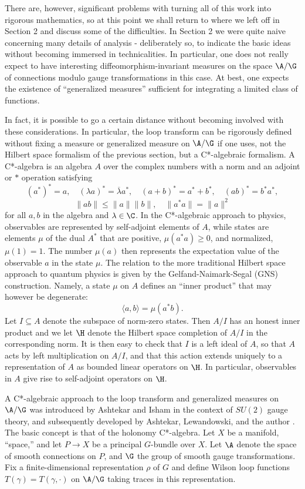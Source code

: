 There are, however, significant problems with turning all of this work into
rigorous mathematics, so at this point we shall return to where we left off
in Section 2 and discuss some of the difficulties. In Section 2 we were
quite naive concerning many details of analysis - deliberately so, to
indicate the basic ideas without becoming immersed in technicalities.   In
particular, one does not really expect to have interesting
diffeomorphism-invariant measures on the space $\A/\G$ of connections
modulo gauge transformations in this case.  At best, one expects the
existence of  ``generalized measures'' sufficient for integrating a limited
class of functions.

In fact, it is possible to go a certain distance without becoming involved
with these considerations.   In particular,
the loop transform can be rigorously defined without fixing a
measure or generalized measure on $\A/\G$ if one uses, not the Hilbert
space formalism of the previous section, but a C*-algebraic formalism.  A
C*-algebra is an algebra $A$ over the complex numbers with a norm and an
adjoint or $\ast$ operation satisfying
\[    (a^\ast)^\ast = a,\quad
(\lambda a)^\ast = \overline \lambda a^\ast, \quad (a + b)^\ast = a^\ast +
b^\ast, \quad (ab)^\ast = b^\ast a^\ast ,\]
\[    \|ab\| \le \|a\| \|b\| , \quad \|a^\ast a\| = \|a\|^2 \]
for all $a,b$ in the algebra and $\lambda
\in \C$.  In the C*-algebraic approach to physics, observables are
represented by self-adjoint elements of $A$, while states are elements
$\mu$ of the dual $A^\ast$ that are positive, $\mu(a^\ast a) \ge 0$,
and normalized, $\mu(1) = 1$.   The number $\mu(a)$ then
represents the expectation value of the observable $a$ in the state $\mu$.
The relation to the more traditional Hilbert space approach to quantum
physics is given by the Gelfand-Naimark-Segal (GNS) construction.  Namely,
a state $\mu$ on $A$ defines an ``inner product'' that may however be
degenerate:
\[             \langle a,b \rangle = \mu(a^\ast b)  .\]
Let $I \subseteq A$ denote the subspace of norm-zero states. Then $A/I$
has an honest inner product and we let $\H$ denote the Hilbert space
completion of $A/I$ in the corresponding norm.  It is then easy to check
that $I$ is a left ideal of $A$, so that $A$ acts by left multiplication on
$A/I$, and that this action extends uniquely to a representation of $A$ as
bounded linear operators on $\H$.  In particular, observables in $A$ give
rise to self-adjoint operators on $\H$.

A C*-algebraic approach to the loop transform and generalized measures on
$\A/\G$ was introduced by Ashtekar and Isham \cite{AI} in the context of
$SU(2)$ gauge theory, and subsequently developed by Ashtekar, Lewandowski,
and the author \cite{AL,Baez}.  The basic concept is that of the holonomy
C*-algebra. Let $X$ be a manifold, ``space,'' and let $P \to X$ be a
principal $G$-bundle over $X$.  Let $\A$ denote the space of smooth
connections on $P$, and $\G$ the group of smooth gauge transformations.
Fix a finite-dimensional representation $\rho$ of $G$ and define Wilson
loop functions $T(\gamma) = T(\gamma,\cdot)$ on $\A/\G$ taking traces in
this representation.


